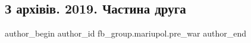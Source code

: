  
 
 
 
 

\subsection{З архівів. 2019. Частина друга}
\label{sec:07_02_2023.fb.fb_group.mariupol.pre_war.5.z_arkh_v_v__2019__ch}

\ifcmt
 author_begin
   author_id fb_group.mariupol.pre_war
 author_end
\fi

